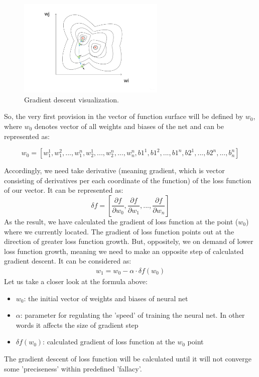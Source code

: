 \begin{figure}[h]
    \centering \includegraphics[width=7cm]{images/gradient_descent.jpg}
    \caption {Gradient descent visualization.}
\end{figure}

So, the very first provision in the vector of function surface will be defined by $w_0$, where $w_0$ denotes vector of all weights and biases of the net and can be represented as: 

\[ w_0 = [w_1^1, w_1^2,...,w_1^n, w_2^1,...,w_2^n,...,w_n^n, b1^1, b1^2,...,b1^n, b2^1,...,b2^n,...,b_n^n] \]

Accordingly, we need take derivative (meaning gradient, which is vector consisting of derivatives per each coordinate of the function) of the loss function of our vector. It can be represented as:
\[ \delta{f} = [\frac{\partial{f}}{\partial{w_0}}, \frac{\partial{f}}{\partial{w_1}}, ... ,\frac{\partial{f}}{\partial{w_n}} ] \]
As the result, we have calculated the gradient of loss function at the point ($w_0$) where we currently located. The gradient of loss function points out at the direction of greater loss function growth. But, oppositely, we on demand of lower loss function growth, meaning we need to make an opposite step of calculated gradient descent. It can be considered as:
\begin{align*}
w_1 = w_0 - \alpha \cdot \delta{f(w_0)}
\end{align*}
Let us take a closer look at the formula above:
\begin{itemize}
    \item $w_0$: the initial vector of weights and biases of neural net
    \item $\alpha$: parameter for regulating the 'speed' of training the neural net. In other words it affects the size of gradient step 
    \item $\delta{f(w_0)}$: calculated gradient of loss function at the $w_0$ point 
\end{itemize}
The gradient descent of loss function will be calculated until it will not converge some 'preciseness' within predefined 'fallacy'.


